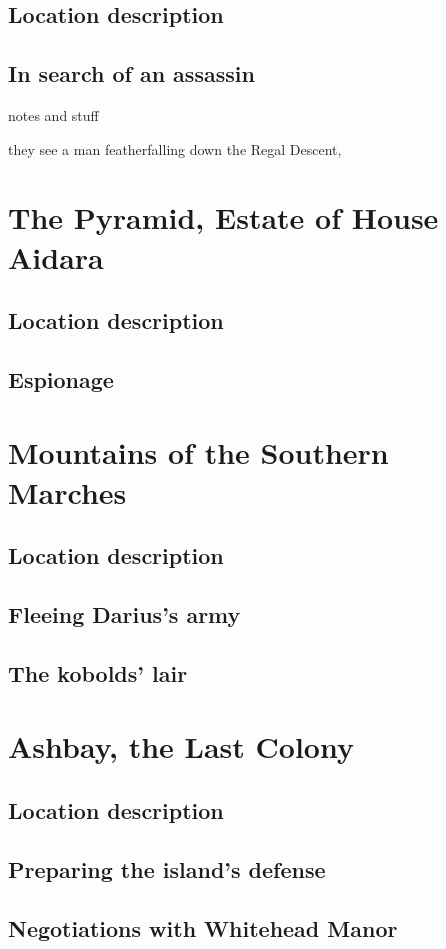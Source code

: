 \documentclass{report}
\theoremstyle{definition}
\begin{document}
\section{Location description}
\section{In search of an assassin}
notes and stuff

they see a man featherfalling down the Regal Descent,
\chapter{The Pyramid, Estate of House Aidara}
\section{Location description}
\section{Espionage}
\chapter{Mountains of the Southern Marches}
\section{Location description}
\section{Fleeing Darius's army}
\section{The kobolds' lair}
\chapter{Ashbay, the Last Colony}
\section{Location description}
\section{Preparing the island's defense}
\section{Negotiations with Whitehead Manor}
\end{document}

